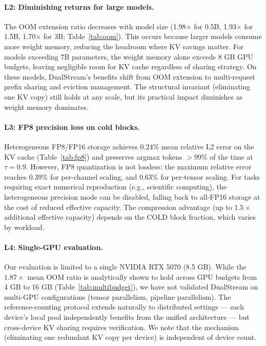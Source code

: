 \documentclass[review]{elsarticle}
\theoremstyle{definition}
\theoremstyle{remark}
\begin{document}
\paragraph{L2: Diminishing returns for large models.}
The OOM extension ratio decreases with model size (1.98$\times$ for
0.5B, 1.93$\times$ for 1.5B, 1.70$\times$ for 3B; Table~\ref{tab:oom}).
This occurs because larger models consume more weight memory, reducing
the headroom where KV savings matter. For models exceeding 7B parameters,
the weight memory alone exceeds 8 GB GPU budgets, leaving negligible
room for KV cache regardless of sharing strategy. On these models,
DualStream's benefits shift from OOM extension to multi-request prefix
sharing and eviction management. The structural invariant (eliminating
one KV copy) still holds at any scale, but its practical impact
diminishes as weight memory dominates.

\paragraph{L3: FP8 precision loss on cold blocks.}
Heterogeneous FP8/FP16 storage achieves 0.24\% mean relative L2 error
on the KV cache (Table~\ref{tab:fp8}) and preserves argmax tokens
$>99\%$ of the time at $\tau=0.9$. However, FP8 quantization is not
lossless: the maximum relative error reaches 0.39\% for per-channel
scaling, and 0.63\% for per-tensor scaling. For tasks requiring exact
numerical reproduction (e.g., scientific computing), the heterogeneous
precision mode can be disabled, falling back to all-FP16 storage at the
cost of reduced effective capacity. The compression advantage (up to
$1.5\times$ additional effective capacity) depends on the COLD block
fraction, which varies by workload.

\paragraph{L4: Single-GPU evaluation.}
Our evaluation is limited to a single NVIDIA RTX 5070 (8.5 GB). While
the $1.87\times$ mean OOM ratio is analytically shown to hold across
GPU budgets from 4 GB to 16 GB (Table~\ref{tab:multibudget}), we have
not validated DualStream on multi-GPU configurations (tensor parallelism,
pipeline parallelism). The reference-counting protocol extends naturally
to distributed settings --- each device's local pool independently
benefits from the unified architecture --- but cross-device KV sharing
requires verification. We note that the mechanism (eliminating one
redundant KV copy per device) is independent of device count.
\end{document}
